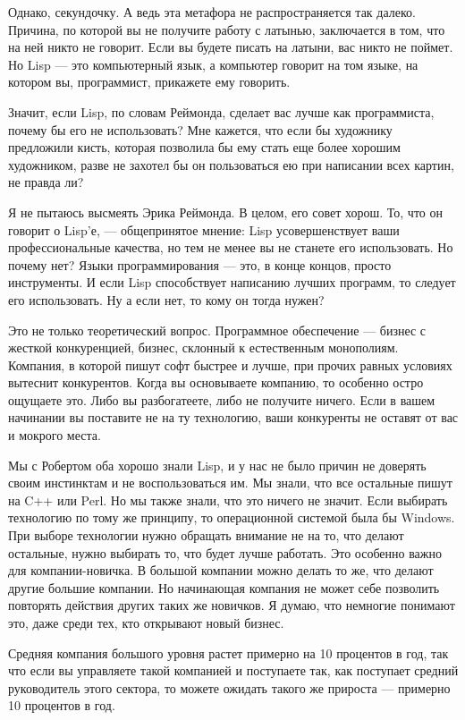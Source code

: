 \documentclass[ebook,12pt,oneside,openany]{memoir}
\begin{document}
Однако, секундочку. А ведь эта метафора не распространяется так
далеко. Причина, по которой вы не получите работу с латынью,
заключается в том, что на ней никто не говорит. Если вы будете писать
на латыни, вас никто не поймет. Но Lisp — это компьютерный язык, а
компьютер говорит на том языке, на котором вы, программист, прикажете
ему говорить.

Значит, если Lisp, по словам Реймонда, сделает вас лучше как
программиста, почему бы его не использовать? Мне кажется, что если бы
художнику предложили кисть, которая позволила бы ему стать еще более
хорошим художником, разве не захотел бы он пользоваться ею при
написании всех картин, не правда ли?

Я не пытаюсь высмеять Эрика Реймонда. В целом, его совет хорош. То,
что он говорит о Lisp'е, — общепринятое мнение: Lisp усовершенствует
ваши профессиональные качества, но тем не менее вы не станете его
использовать. Но почему нет? Языки программирования — это, в конце
концов, просто инструменты. И если Lisp способствует написанию лучших
программ, то следует его использовать. Ну а если нет, то кому он тогда
нужен?

Это не только теоретический вопрос. Программное обеспечение — бизнес с
жесткой конкуренцией, бизнес, склонный к естественным монополиям.
Компания, в которой пишут софт быстрее и лучше, при прочих равных
условиях вытеснит конкурентов. Когда вы основываете компанию, то
особенно остро ощущаете это. Либо вы разбогатеете, либо не получите
ничего. Если в вашем начинании вы поставите не на ту технологию, ваши
конкуренты не оставят от вас и мокрого места.

Мы с Робертом оба хорошо знали Lisp, и у нас не было причин не
доверять своим инстинктам и не воспользоваться им. Мы знали, что все
остальные пишут на C++ или Perl. Но мы также знали, что это ничего не
значит. Если выбирать технологию по тому же принципу, то операционной
системой была бы Windows. При выборе технологии нужно обращать
внимание не на то, что делают остальные, нужно выбирать то, что будет
лучше работать. Это особенно важно для компании-новичка. В большой
компании можно делать то же, что делают другие большие компании. Но
начинающая компания не может себе позволить повторять действия других
таких же новичков. Я думаю, что немногие понимают это, даже среди тех,
кто открывают новый бизнес.

Средняя компания большого уровня растет примерно на 10 процентов в
год, так что если вы управляете такой компанией и поступаете так, как
поступает средний руководитель этого сектора, то можете ожидать такого
же прироста — примерно 10 процентов в год.
\end{document}
